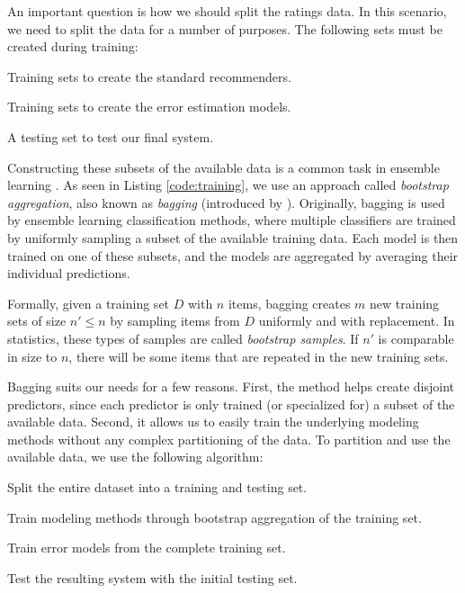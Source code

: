 An important question is how we should split the ratings data.
In this scenario, we need to split the data for a number of purposes.
The following sets must be created during training:

\begin{enumerate*}
  \item Training sets to create the standard recommenders.
  \item Training sets to create the error estimation models.
  \item A testing set to test our final system.
\end{enumerate*}

Constructing these subsets of the available data is a common task in ensemble learning
\cite[p7]{Polikar2006}.
As seen in Listing \ref{code:training}, we use an approach called 
\emph{bootstrap aggregation}, also known as \emph{bagging}
(introduced by \cite{Breiman1996}).
Originally, bagging is used by ensemble learning classification methods, where multiple classifiers are 
trained by uniformly sampling a subset of the available training data. 
Each model is then trained on one of these subsets, and the models are aggregated by averaging their individual predictions.

Formally, given a training set $D$ with $n$ items, bagging creates $m$ new training sets of size $n' \leq n$ by sampling
items from $D$ uniformly and with replacement. 
In statistics, these types of samples are called \emph{bootstrap samples}.
If $n'$ is comparable in size to $n$, there will be some items
that are repeated in the new training sets.

Bagging suits our needs for a few reasons. First, the method helps create disjoint predictors, 
since each predictor is only trained (or specialized for) a subset of the available data.
Second, it allows us to easily train the underlying modeling methods without any complex partitioning of the data.
To partition and use the available data, we use the following algorithm:

\begin{enumerate*}
  \item Split the entire dataset into a training and testing set.
  \item Train modeling methods through bootstrap aggregation of the training set.
  \item Train error models from the complete training set.
  \item Test the resulting system with the initial testing set.
\end{enumerate*}

